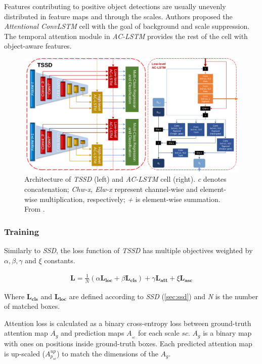 Features contributing to positive object detections are usually unevenly distributed in feature maps and through the scales. Authors proposed the \textit{Attentional ConvLSTM} cell with the goal of background and scale suppression.  The temporal attention module in \textit{AC-LSTM} provides the rest of the cell with object-aware features. 

\begin{figure}
    \centering
    \includegraphics[width=\textwidth]{img/tssd}
    \caption{Architecture of \textit{TSSD} (left) and \textit{AC-LSTM} cell (right). \textit{c} denotes concatenation; \textit{Chw-x}, \textit{Elw-x} represent channel-wise and element-wise multiplication, respectively; \textit{+} is element-wise summation. From \cite[fig.~2,~3]{bib:tssd}.}
    \label{fig:tssd}
\end{figure}


\subsubsection{Training}
Similarly to \textit{SSD}, the loss function of \textit{TSSD} has multiple objectives weighted by $\alpha, \beta, \gamma$ and $\xi$ constants.

\begin{align*}
\mathbf{L} = \frac{1}{N}(\alpha\mathbf{L_{\text{loc}}} + \beta\mathbf{L_{\text{cls}}}) + \gamma\mathbf{L_{\text{att}}} + \xi\mathbf{L_{\text{asc}}}
\end{align*}


Where $\mathbf{L_{\text{cls}}}$ and $\mathbf{L_{\text{loc}}}$ are defined according to \textit{SSD} (\cref{sec:ssd}) and \textit{N} is the number of matched boxes.

Attention loss is calculated as a binary cross-entropy loss between ground-truth attention map $A_g$ and prediction maps $A_{_{sc}}$ for each scale $sc$. $A_g$ is a binary map with ones on positions inside ground-truth boxes. Each predicted attention map is up-scaled ($A^{up}_{p_{sc}}$) to match the dimensions of the $A_g$.

